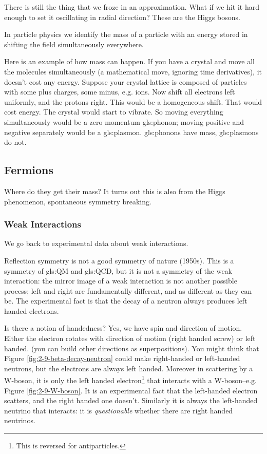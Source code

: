 \documentclass[]{article}
\begin{document}
There is still the thing that we froze in an approximation. What if we hit it hard enough to set it oscillating in radial direction? These are the Higgs bosons.
 
In particle physics we identify the mass of a particle with an energy stored in shifting the field simultaneously everywhere.

Here is an example of how mass can happen. If you have a crystal and move all the molecules simultaneously (a mathematical move, ignoring time derivatives), it doesn't cost any energy. Suppose your crystal lattice is composed of particles with some plus charges, some minus, e.g. ions. Now shift all electrons left uniformly, and the protons right. This would be a homogeneous shift. That would cost energy. The crystal would start to vibrate. So moving everything simultaneously would be a zero momentum \gls{gls:phonon}; moving positive and negative separately would be a \gls{gls:plasmon}. \Glspl{gls:phonon} have mass, \glspl{gls:plasmon} do not. 

\subsection{Fermions}

Where do they get their mass? It turns out this is also from the Higgs phenomenon, spontaneous symmetry breaking.

\subsubsection{Weak Interactions}
We go back to experimental data about weak interactions.

Reflection symmetry is not a good symmetry of nature (1950s). This is a symmetry of \gls{gls:QM} and \gls{gls:QCD}, but it is not a symmetry of the weak interaction: the mirror image of a weak interaction is not another possible process; left and right are fundamentally different, and as different as they can be. The experimental fact is that the decay of a neutron always produces left handed electrons.

Is there a notion of handedness? Yes, we have spin and direction of motion. Either the electron rotates with direction of motion (right handed screw) or left handed. (you can build other directions as superpositions). You might think that Figure \ref{fig:2-9-beta-decay-neutron} could make right-handed or left-handed neutrons, but the electrons are always left handed. Moreover in scattering by a W-boson, it is only the left handed electron\footnote{This is reversed for antiparticles.} that interacts with a W-boson--e.g. Figure \ref{fig:2-9-W-boson}. It is an experimental fact that the left-handed electron scatters, and the right handed one doesn't. Similarly it is always the left-handed neutrino that interacts: it is \emph{questionable} whether there are right handed neutrinos.
\end{document}
